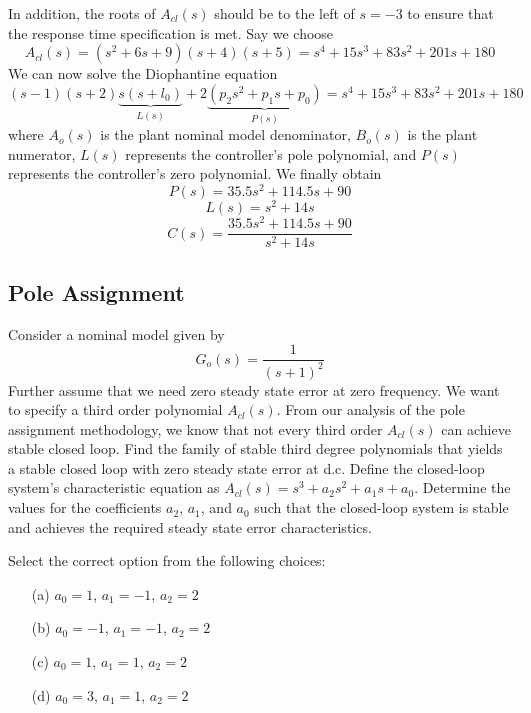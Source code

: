 \documentclass[12pt]{article}
\begin{document}
In addition, the roots of $A_{cl}(s)$ should be to the left of $s = -3$ to ensure that the response time specification is met. Say we choose
\begin{equation}
A_{cl}(s) = (s^2 + 6s + 9)(s + 4)(s + 5) = s^4 + 15s^3 + 83s^2 + 201s + 180
\end{equation}
We can now solve the Diophantine equation
\begin{equation}
(s - 1)(s + 2) \underbrace{s(s + l_0)}_{L(s)} + 2 \underbrace{(p_2s^2 + p_1s + p_0)}_{P(s)} = s^4 + 15s^3 + 83s^2 + 201s + 180
\end{equation}
where $A_o(s)$ is the plant nominal model denominator, $B_o(s)$ is the plant numerator, $L(s)$ represents the controller's pole polynomial, and $P(s)$ represents the controller's zero polynomial.
We finally obtain
\begin{equation}
P(s) = 35.5s^2 + 114.5s + 90
\end{equation}
\begin{equation}
L(s) = s^2 + 14s
\end{equation}
\begin{equation}
C(s) = \frac{35.5s^2 + 114.5s + 90}{s^2 + 14s}
\end{equation}
\clearpage

\subsection{Pole Assignment}

Consider a nominal model given by
\begin{equation}
G_o(s) = \frac{1}{(s + 1)^2}
\end{equation}
Further assume that we need zero steady state error at zero frequency. We want to specify a third order polynomial $A_{cl}(s)$. From our analysis of the pole assignment methodology, we know that not every third order $A_{cl}(s)$ can achieve stable closed loop. Find the family of stable third degree polynomials that yields a stable closed loop with zero steady state error at d.c. Define the closed-loop system's characteristic equation as \(A_{cl}(s) = s^3 + a_2s^2 + a_1s + a_0\). Determine the values for the coefficients \(a_2\), \(a_1\), and \(a_0\) such that the closed-loop system is stable and achieves the required steady state error characteristics.

Select the correct option from the following choices:
\begin{itemize}
    \item[(a)] $a_0 = 1$, $a_1 = -1$, $a_2 = 2$
    \item[(b)] $a_0 = -1$, $a_1 = -1$, $a_2 = 2$
    \item[(c)] $a_0 = 1$, $a_1 = 1$, $a_2 = 2$
    \item[(d)] $a_0 = 3$, $a_1 = 1$, $a_2 = 2$
\end{itemize}
\end{document}
